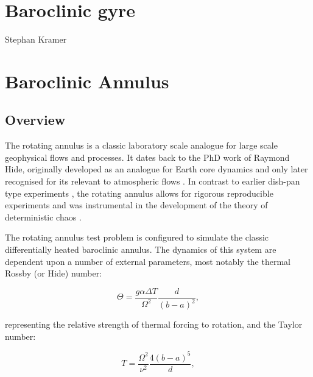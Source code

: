
\section{Baroclinic gyre}
\label{sect:baroclinic_gyre}

Stephan Kramer


\section{Baroclinic Annulus}
\label{sect:annulus}

\subsection{Overview}

The rotating annulus is a classic laboratory scale analogue for large scale
geophysical flows and processes. It dates back to the PhD work of Raymond Hide,
originally developed as an analogue for Earth core dynamics \citep{hide1952} and only
later recognised for its relevant to atmospheric flows \citep{hide1953, hide2006}.
In contrast to earlier dish-pan type experiments \citep{fultz1951}, the rotating
annulus allows for rigorous reproducible experiments and was instrumental in the
development of the theory of deterministic chaos \citep{lorenz1963}.

The rotating annulus test problem is configured to simulate the classic
differentially heated baroclinic annulus. The dynamics
of this system are dependent upon a number of external parameters, most notably
the thermal Rossby (or Hide) number:

\begin{equation}\label{eqn:hide_number}
  \Theta = \frac{g \alpha \Delta T}{\Omega^2} \frac{d}{(b - a)^2},
\end{equation}

representing the relative strength of thermal forcing to rotation, and the Taylor number:

\begin{equation}\label{eqn:taylor_number}
  T = \frac{\Omega^2}{\nu^2} \frac{4(b - a)^5}{d},
\end{equation}

